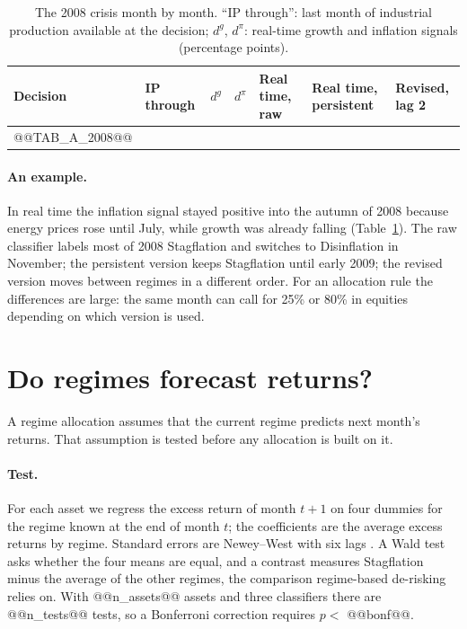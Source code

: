 \documentclass[11pt,a4paper]{article}
\begin{document}
\begin{table}[htbp]
\centering
\caption{The 2008 crisis month by month. ``IP through'': last month of industrial production available at the
decision; $d^g$, $d^\pi$: real-time growth and inflation signals (percentage points).}
\label{tab:2008}
\footnotesize
\setlength{\tabcolsep}{4pt}
\begin{tabular}{@{}llrrlll@{}}
\toprule
Decision & IP through & $d^g$ & $d^\pi$ & Real time, raw & Real time, persistent & Revised, lag 2 \\
\midrule
@@TAB_A_2008@@
\bottomrule
\end{tabular}
\end{table}

\paragraph{An example.} In real time the inflation signal stayed positive into the autumn of 2008 because
energy prices rose until July, while growth was already falling (Table~\ref{tab:2008}). The raw classifier
labels most of 2008 Stagflation and switches to Disinflation in November; the persistent version keeps
Stagflation until early 2009; the revised version moves between regimes in a different order. For an
allocation rule the differences are large: the same month can call for 25\% or 80\% in equities depending on
which version is used.

\section{Do regimes forecast returns?}
\label{sec:predict}

A regime allocation assumes that the current regime predicts next month's returns. That assumption is tested before any allocation is built on it.


\paragraph{Test.} For each asset we regress the excess return of month $t+1$ on four dummies for the regime known
at the end of month $t$; the coefficients are the average excess returns by regime. Standard errors are
Newey--West with six lags \citep{newey1987}. A Wald test asks whether the four means are equal, and a contrast
measures Stagflation minus the average of the other regimes, the comparison regime-based de-risking relies on.
With @@n_assets@@ assets and three classifiers there are @@n_tests@@ tests, so a Bonferroni correction requires
$p<$ @@bonf@@.
\end{document}
